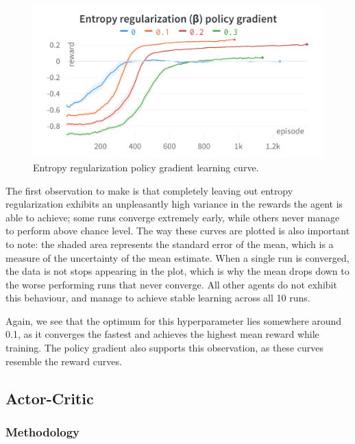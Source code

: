 \documentclass{article}
\begin{document}
\begin{figure}[htbp]
    \centering
    \includegraphics[width=\linewidth]{figs/ER-PG.png}
    \caption{Entropy regularization policy gradient learning curve.}
    \label{fig:er-pg}
\end{figure}

The first observation to make is that completely leaving out entropy regularization exhibits an unpleasantly high variance in the rewards the agent is able to achieve; some runs converge extremely early, while others never manage to perform above chance level.
The way these curves are plotted is also important to note: the shaded area represents the standard error of the mean, which is a measure of the uncertainty of the mean estimate.
When a single run is converged, the data is not stops appearing in the plot, which is why the mean drops down to the worse performing runs that never converge.
All other agents do not exhibit this behaviour, and manage to achieve stable learning across all 10 runs.

Again, we see that the optimum for this hyperparameter lies somewhere around 0.1, as it converges the fastest and achieves the highest mean reward while training.
The policy gradient also supports this observation, as these curves resemble the reward curves.

\subsection{Actor-Critic}
\label{A-Actor-Critic}


\subsubsection{Methodology}
\label{AC-Method}
\end{document}

